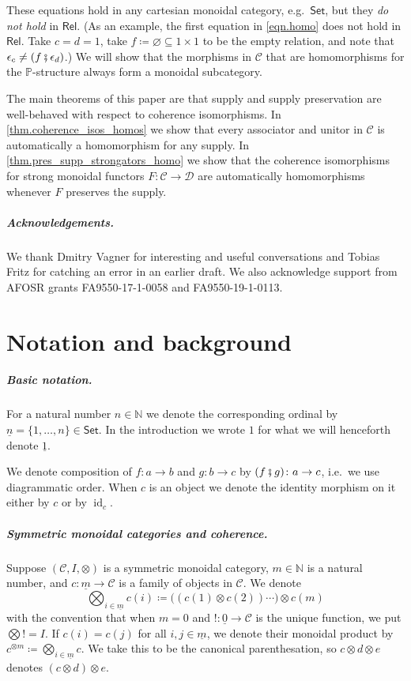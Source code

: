 \documentclass[11pt, oneside, article]{memoir}
\theoremstyle{plain}
\theoremstyle{definition}
\theoremstyle{remark}
\newcommand{\ord}[1]{\underline{#1}}%
\newcommand{\cat}[1]{\mathcal{#1}}%
\newcommand{\Cat}[1]{{\mathsf{#1}}}%
\DeclareMathOperator{\id}{id}
\newcommand{\tpow}[1]{^{\otimes #1}}
\newcommand{\smset}{\Cat{Set}}
\newcommand{\nn}{\mathbb{N}}
\newcommand{\pp}{\mathbb{P}}
\newcommand{\rel}{\Cat{Rel}}
\newcommand{\cp}{\mathbin{\fatsemi}}
\renewcommand{\ss}{\subseteq}
\begin{document}
These equations hold in any cartesian monoidal category, e.g.\ $\smset$, but they \emph{do not hold} in $\rel$. (As an example, the first equation in \eqref{eqn.homo} does not hold in $\rel$. Take $c=d=1$, take $f\coloneqq\varnothing\ss 1\times 1$ to be the empty relation, and note that $\epsilon_c \neq (f\cp\epsilon_d)$.) We will show that the morphisms in $\cat{C}$ that are homomorphisms for the $\pp$-structure always form a monoidal subcategory.

The main theorems of this paper are that supply and supply preservation are well-behaved with respect to coherence isomorphisms. In \cref{thm.coherence_isos_homos} we show that every associator and unitor in $\cat{C}$ is automatically a homomorphism for any supply. In \cref{thm.pres_supp_strongators_homo} we show that the coherence isomorphisms for strong monoidal functors $F\colon\cat{C}\to\cat{D}$ are automatically homomorphisms whenever $F$ preserves the supply.
 
\paragraph{Acknowledgements.}
We thank Dmitry Vagner for interesting and useful conversations and Tobias Fritz for catching an error in an earlier draft. We also acknowledge support from AFOSR grants FA9550-17-1-0058 and FA9550-19-1-0113.


\chapter{Notation and background}

\paragraph{Basic notation.}
For a natural number $n\in\nn$ we denote the corresponding ordinal by $\ord{n}=\{1,\ldots,n\}\in\smset$. In the introduction we wrote $1$ for what we will henceforth denote $\ord{1}$.

We denote composition of $f\colon a\to b$ and $g\colon b\to c$ by $(f\cp g)\colon a\to c$, i.e.\ we use diagrammatic order. When $c$ is an object we denote the identity morphism on it either by $c$ or by $\id_c$.

\paragraph{Symmetric monoidal categories and coherence.}
Suppose $(\cat{C}, I, \otimes)$ is a symmetric monoidal category, $m\in\nn$ is a natural number, and $c\colon\ord{m}\to\cat{C}$ is a family of objects in $\cat{C}$. We denote
\[
	\bigotimes_{i\in\ord{m}}c(i)\coloneqq
  \big((c(1)\otimes c(2))\cdots\big)\otimes c(m)
\]
with the convention that when $m=0$ and $!\colon\ord{0}\to \cat{C}$ is the unique function, we put $\bigotimes != I$. If $c(i)=c(j)$ for all $i,j\in\ord{m}$, we denote their monoidal product by $c\tpow{m}\coloneqq\bigotimes_{i\in\ord{m}}c$. We take this to be the canonical parenthesation, so $c\otimes d\otimes e$ denotes $(c\otimes d)\otimes e$. 
\end{document}
